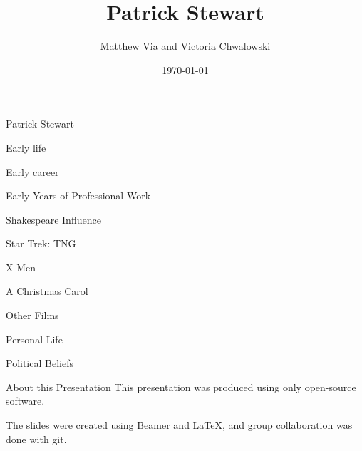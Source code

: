 \documentclass[xcolor=dvipsnames]{beamer}
\begin{document}
\author{Matthew Via and Victoria Chwalowski}
\title{Patrick Stewart}
\date{\today}
\begin{frame}{Patrick Stewart}

\end{frame}
\begin{frame}{Early life}

\end{frame}
\begin{frame}{Early career}

\end{frame}
\begin{frame}{Early Years of Professional Work}

\end{frame}
\begin{frame}{Shakespeare Influence}

\end{frame}
\begin{frame}{Star Trek: TNG}

\end{frame}
\begin{frame}{X-Men}

\end{frame}
\begin{frame}{A Christmas Carol}

\end{frame}
\begin{frame}{Other Films}

\end{frame}
\begin{frame}{Personal Life}

\end{frame}
\begin{frame}{Political Beliefs}

\end{frame}
\begin{frame}{About this Presentation}
This presentation was produced using only open-source software.

The slides were created using Beamer and LaTeX, and group collaboration was done
with git.
\end{frame}
\end{document}
